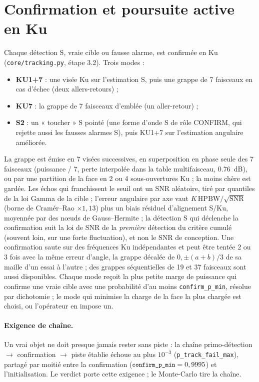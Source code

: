 \documentclass[11pt,a4paper]{article}
\newcommand{\code}[1]{\texttt{\small #1}}
\begin{document}
\section{Confirmation et poursuite active en Ku}\label{sec:ku}
Chaque détection S, vraie cible ou fausse alarme, est confirmée en Ku (\code{core/tracking.py}, étape 3.2). Trois
modes :
\begin{itemize}
  \item \textbf{KU1+7} : une visée Ku sur l'estimation S, puis une grappe de 7 faisceaux en cas d'échec (deux
        allers-retours) ;
  \item \textbf{KU7} : la grappe de 7 faisceaux d'emblée (un aller-retour) ;
  \item \textbf{S2} : un « toucher » S pointé (une forme d'onde S de rôle CONFIRM, qui rejette aussi les fausses
        alarmes S), puis KU1+7 sur l'estimation angulaire améliorée.
\end{itemize}
La grappe est émise en 7 visées successives, en superposition en phase seule des 7 faisceaux (puissance / 7, perte
interpolée dans la table multifaisceau, \SI{0.76}{dB}), ou par une partition de la face en 2 ou 4 sous-ouvertures Ku ;
la moins chère est gardée. Les échos qui franchissent le seuil ont un SNR aléatoire, tiré par quantiles de la loi Gamma
de la cible ; l'erreur angulaire par axe vaut $K\,\mathrm{HPBW}/\sqrt{\mathrm{SNR}}$ (borne de Cramér--Rao $\times 1,13$)
plus un biais résiduel d'alignement S/Ku, moyennée par des n\oe{}uds de Gauss--Hermite ; la détection S qui déclenche la
confirmation suit la loi de SNR de la \emph{première} détection du critère cumulé (souvent loin, sur une forte
fluctuation), et non le SNR de conception. Une confirmation saute sur des fréquences Ku indépendantes et peut être
tentée 2 ou 3 fois avec la même erreur d'angle, la grappe décalée de $0, \pm(a+b)/3$ de sa maille d'un essai à
l'autre ; des grappes séquentielles de 19 et 37 faisceaux sont aussi disponibles. Chaque mode reçoit la plus petite
marge de puissance qui confirme une vraie cible avec une probabilité d'au moins \code{confirm\_p\_min}, résolue par
dichotomie ; le mode qui minimise la charge de la face la plus chargée est choisi, ou l'opérateur en impose un.

\paragraph{Exigence de chaîne.} Un vrai objet ne doit presque jamais rester sans piste : la chaîne primo-détection
$\to$ confirmation $\to$ piste établie échoue au plus $10^{-3}$ (\code{p\_track\_fail\_max}), partagé par moitié entre
la confirmation ($\code{confirm\_p\_min} = 0,9995$) et l'initialisation. Le verdict porte cette exigence ; le
Monte-Carlo tire la chaîne.
\end{document}
